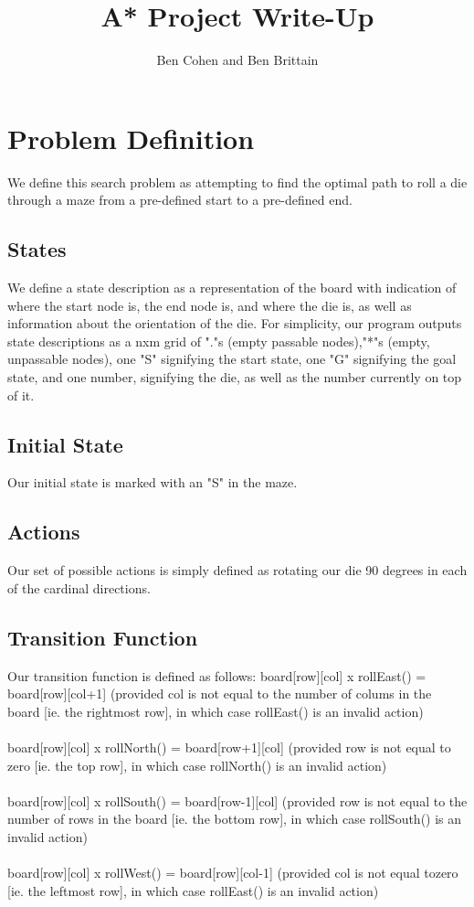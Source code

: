 \documentclass{article}
\title{A* Project Write-Up}
\author{Ben Cohen and Ben Brittain}
\begin{document}
\maketitle
\section*{Problem Definition}
We define this search problem as attempting to find the optimal path to roll a die through a maze from a pre-defined start to a pre-defined end.   
\subsection*{States}
We define a state description as a representation of the board with indication of where the start node is, the end node is, and where the die is, as well as information about the orientation of the die.  For simplicity, our program outputs state descriptions as a nxm grid of "."s (empty passable nodes),"*"s (empty, unpassable nodes), one "S" signifying the start state, one "G" signifying the goal state, and one number, signifying the die, as well as the number currently on top of it.  
\subsection*{Initial State}Our initial state is marked with an "S" in the maze. 
\subsection*{Actions}Our set of possible actions is simply defined as rotating our die 90 degrees in each of the cardinal directions.  
\subsection*{Transition Function} Our transition function is defined as follows: 
board[row][col] x rollEast() = board[row][col+1] (provided col is not equal to the number of colums in the board [ie. the rightmost row], in which case rollEast() is an invalid action)\\\\
board[row][col] x rollNorth() = board[row+1][col] (provided row is not equal to zero [ie. the top row], in which case rollNorth() is an invalid action)\\\\
board[row][col] x rollSouth() = board[row-1][col] (provided row is not equal to the number of rows in the board [ie. the bottom row], in which case rollSouth() is an invalid action)\\\\
board[row][col] x rollWest() = board[row][col-1] (provided col is not equal tozero [ie. the leftmost row], in which case rollEast() is an invalid action)
\end{document}
